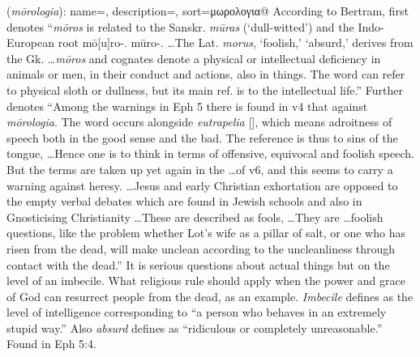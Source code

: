 \item[Absurd talk,]

(\textit{mōrologia}):
{
    name=,
    description={},
    sort=μωρολογια@
}
According to Bertram,  first denotes ``\emph{mōros} is related to the Sanskr. \emph{mūras} (`dull-witted') and the Indo-European root mō[u]ro-. mūro-. \ldots The Lat. \emph{morus}, `foolish,' `absurd,' derives from the Gk. \ldots \emph{mōros} and cognates denote a physical or intellectual deficiency in animals or men, in their conduct and actions, also in things. The word can refer to physical sloth or dullness, but its main ref. is to the intellectual life.''
Further  denotes ``Among the warnings in Eph 5 there is found in v4 that against \emph{mōrologia}. The word occurs alongside \emph{eutrapelia} [], which means adroitness of speech both in the good sense and the bad. The reference is thus to sins of the tongue, \ldots Hence one is to think in terms of offensive, equivocal and foolish speech. But the terms are taken up yet again in the \ldots of v6, and this seems to carry a warning against heresy. \ldots Jesus and early Christian exhortation are opposed to the empty verbal debates which are found in Jewish schools and also in Gnosticising Christianity \ldots These are described as fools, \ldots They are \ldots foolish questions, like the problem whether Lot's wife as a pillar of salt, or one who has risen from the dead, will make unclean according to the uncleanliness through contact with the dead.''
It is serious questions about actual things but on the level of an imbecile. What religious rule should apply when the power and grace of God can resurrect people from the dead, as an example. \emph{Imbecile} defines as the level of intelligence corresponding to ``a person who behaves in an extremely stupid way.'' Also \emph{absurd} defines as ``ridiculous or completely unreasonable.''
Found in Eph 5:4.
